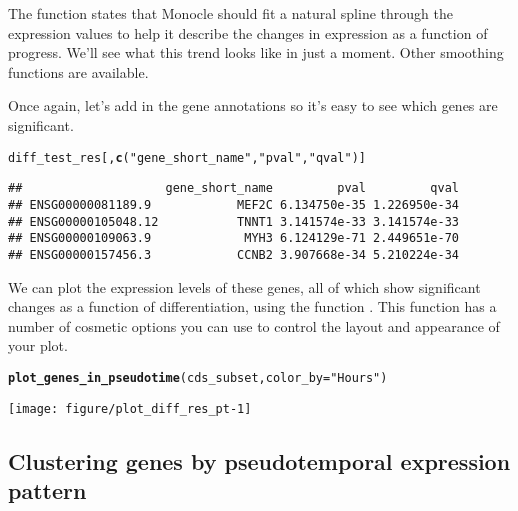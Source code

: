 \documentclass[10pt,oneside]{article}\usepackage[]{graphicx}\usepackage[]{color}
\makeatletter
\def\maxwidth{ %
  \ifdim\Gin@nat@width>\linewidth
    \linewidth
  \else
    \Gin@nat@width
  \fi
}
\newcommand{\hlstr}[1]{\textcolor[rgb]{0.192,0.494,0.8}{#1}}%
\newcommand{\hlstd}[1]{\textcolor[rgb]{0.345,0.345,0.345}{#1}}%
\newcommand{\hlkwc}[1]{\textcolor[rgb]{0.333,0.667,0.333}{#1}}%
\newcommand{\hlkwd}[1]{\textcolor[rgb]{0.737,0.353,0.396}{\textbf{#1}}}%
\newenvironment{kframe}{%
 \def\at@end@of@kframe{}%
 \ifinner\ifhmode%
  \def\at@end@of@kframe{\end{minipage}}%
  \begin{minipage}{\columnwidth}%
 \fi\fi%
 \def\FrameCommand##1{\hskip\@totalleftmargin \hskip-\fboxsep
 \colorbox{shadecolor}{##1}\hskip-\fboxsep
     \hskip-\linewidth \hskip-\@totalleftmargin \hskip\columnwidth}%
 \MakeFramed {\advance\hsize-\width
   \@totalleftmargin\z@ \linewidth\hsize
   \@setminipage}}%
 {\par\unskip\endMakeFramed%
 \at@end@of@kframe}
\newenvironment{knitrout}{}{} %
\makeatother
\begin{document}
The  function states that Monocle should fit a natural spline through the expression values to help it describe the changes in expression as a function of progress. We'll see what this trend looks like in just a moment. Other smoothing functions are available.

Once again, let's add in the gene annotations so it's easy to see which genes are significant.
\begin{knitrout}
\color{fgcolor}\begin{kframe}
\begin{alltt}
\hlstd{diff_test_res[,}\hlkwd{c}\hlstd{(}\hlstr{"gene_short_name"}\hlstd{,} \hlstr{"pval"}\hlstd{,} \hlstr{"qval"}\hlstd{)]}
\end{alltt}
\begin{verbatim}
##                    gene_short_name         pval         qval
## ENSG00000081189.9            MEF2C 6.134750e-35 1.226950e-34
## ENSG00000105048.12           TNNT1 3.141574e-33 3.141574e-33
## ENSG00000109063.9             MYH3 6.124129e-71 2.449651e-70
## ENSG00000157456.3            CCNB2 3.907668e-34 5.210224e-34
\end{verbatim}
\end{kframe}
\end{knitrout}

We can plot the expression levels of these genes, all of which show significant changes as a function of differentiation, using the function . This function has a number of cosmetic options you can use to control the layout and appearance of your plot.

\begin{knitrout}
\color{fgcolor}\begin{kframe}
\begin{alltt}
\hlkwd{plot_genes_in_pseudotime}\hlstd{(cds_subset,} \hlkwc{color_by}\hlstd{=}\hlstr{"Hours"}\hlstd{)}
\end{alltt}
\end{kframe}

{\centering \texttt{[image: figure/plot\_diff\_res\_pt-1]} 

}



\end{knitrout}

\subsection{Clustering genes by pseudotemporal expression pattern}
\end{document}
